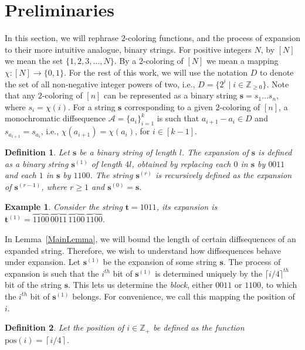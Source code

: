 \documentclass[11pt]{article}
\newtheorem{ex}{Example}
\newtheorem{definition}{Definition}
\begin{document}
\section{Preliminaries}\label{prev}
In this section, we will rephrase $2$-coloring functions, and the process of expansion to their more intuitive analogue, binary strings. For positive integers \( N \), by \(  [N] \) we mean the set \( \{1, 2, 3, \ldots, N\} \). By a 2-coloring of \([N] \) we mean a mapping \( \chi :[N] \to \{0, 1\} \). For the rest of this work, we will use the notation $D$ to denote the set of all non-negative integer powers of two, i.e., $D=\{2^i\mid i\in\mathbb{Z}_{\ge0}\}$.
Note that any $2$-coloring of $[n]$ can be represented as a binary string $\mathbf{s} = s_1 \ldots s_n$, where $s_i = \chi(i)$. For a string $\mathbf{s}$ corresponding to a given $2$-coloring of $[n]$, a monochromatic diffsequence $\mathcal{A} = \{a_i \}_{i=1}^{k}$ is such that $a_{i+1}-a_i \in D$ and $s_{a_{i+1}} = s_{a_i}$, i.e., $\chi(a_{i+1}) = \chi(a_i)$, for $i \in [k-1]$.
\begin{definition}\label{expand}
    Let $\mathbf{s}$ be a binary string of length $l$. The expansion of $\mathbf{s}$ is defined as a binary string $\mathbf{s}^{(1)}$ of length $4l$, obtained by replacing each $0$ in $\mathbf{s}$ by $0011$ and each $1$ in $\mathbf{s}$ by $1100$. The string $\mathbf{s}^{(r)}$ is recursively defined as the expansion of $\mathbf{s}^{(r-1)}$, where $r \ge 1$ and $\mathbf{s}^{(0)} = \mathbf{s}$.
\end{definition}


\begin{ex}\label{bigex}
    Consider the string $\mathbf{t}=1011$, its expansion is $\mathbf{t}^{(1)} = \overbrace{1100}_{\phantom{.}}\,\overbrace{0011}_{\phantom{.}}\,\overbrace{1100}_{\phantom{.}}\,\overbrace{1100}_{\phantom{.}}$. 
\end{ex}
In Lemma~\ref{MainLemma}, we will bound the length of certain diffsequences of an expanded string. Therefore, we wish to understand how diffsequences behave under expansion. Let $\mathbf{s}^{(1)}$ be the expansion of some string $\mathbf{s}$. The process of expansion is such that the $i^{th}$ bit of $\mathbf{s}^{(1)}$ is determined uniquely by the $\lceil i/4 \rceil^{th}$ bit of the string $\mathbf{s}$. This lets us determine the \textit{block}, either $0011$ or $1100$, to which the $i^{th}$ bit of $\mathbf{s}^{(1)}$ belongs. For convenience, we call this mapping the position of $i$.
\begin{definition}\label{pos}
    Let the position of $i \in \mathbb{Z}_{+}$ be defined as the function $\text{pos}(i)=\left\lceil i/4 \right\rceil$.
\end{definition}
\end{document}
